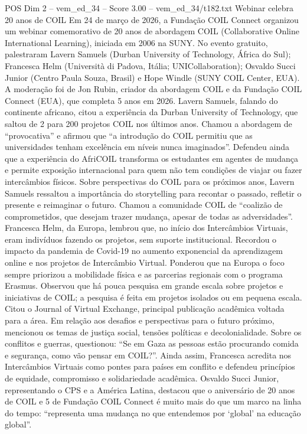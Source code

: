 \begin{textsample}{POS Dim 2 – vem\_ed\_34 – Score 3.00 – vem\_ed\_34/t182.txt}  \label{ex:f2_pos_007}
Webinar celebra 20 anos de COIL Em 24 de março de 2026, a Fundação COIL Connect organizou um webinar comemorativo de 20 anos de abordagem COIL (Collaborative Online International Learning), iniciada em 2006 na SUNY.
No evento gratuito, palestraram Lavern Samuels (Durban University of Technology, África do Sul); Francesca Helm (Università di Padova, Itália; UNICollaboration); Osvaldo Succi Junior (Centro Paula Souza, Brasil) e Hope Windle (SUNY COIL Center, EUA).
A moderação foi de Jon Rubin, criador da abordagem COIL e da Fundação COIL Connect (EUA), que completa 5 anos em 2026.
Lavern Samuels, falando do continente africano, citou a experiência da Durban University of Technology, que saltou de 2 para 200 projetos COIL nos últimos anos.
Chamou a abordagem de “provocativa” e afirmou que “a introdução do COIL permitiu que as universidades tenham excelência em níveis nunca imaginados”.
Defendeu ainda que a experiência do AfriCOIL transforma os estudantes em agentes de mudança e permite exposição internacional para quem não tem condições de viajar ou fazer intercâmbios físicos.
Sobre perspectivas do COIL para os próximos anos, Lavern Samuels ressaltou a importância do storytelling para recontar o passado, refletir o presente e reimaginar o futuro.
Chamou a comunidade COIL de “coalizão de comprometidos, que desejam trazer mudança, apesar de todas as adversidades”.
Francesca Helm, da Europa, lembrou que, no início dos Intercâmbios Virtuais, eram indivíduos fazendo os projetos, sem suporte institucional.
Recordou o impacto da pandemia de Covid-19 no aumento exponencial da aprendizagem online e nos projetos de Intercâmbio Virtual.
Ponderou que na Europa o foco sempre priorizou a mobilidade física e as parcerias regionais com o programa Erasmus.
Observou que há pouca pesquisa em grande escala sobre projetos e iniciativas de COIL; a pesquisa é feita em projetos isolados ou em pequena escala.
Citou o Journal of Virtual Exchange, principal publicação acadêmica voltada para a área.
Em relação aos desafios e perspectivas para o futuro próximo, mencionou os temas de justiça social, tensões políticas e decolonialidade.
Sobre os conflitos e guerras, questionou: “Se em Gaza as pessoas estão procurando comida e segurança, como vão pensar em COIL?”.
Ainda assim, Francesca acredita nos Intercâmbios Virtuais como pontes para países em conflito e defendeu princípios de equidade, compromisso e solidariedade acadêmica.
Osvaldo Succi Junior, representando o CPS e a América Latina, destacou que o aniversário de 20 anos de COIL e 5 de Fundação COIL Connect é muito mais do que um marco na linha do tempo: “representa uma mudança no que entendemos por ‘global’ na educação global”.

\end{textsample}
